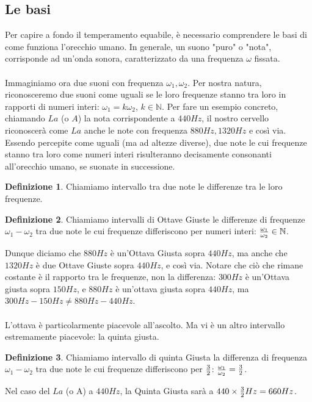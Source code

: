 \documentclass[12pt,a4paper]{book}
\theoremstyle{definition}
\newtheorem{Def}{Definizione}[chapter]
\theoremstyle{Theorem}
\theoremstyle{definition}
\theoremstyle{definition}
\theoremstyle{definition}
\begin{document}
	\subsection{Le basi}
	Per capire a fondo il temperamento equabile, è necessario comprendere le basi di come funziona l'orecchio umano. In generale, un suono "puro" o "nota", corrisponde ad un'onda sonora, caratterizzato da una frequenza $\omega$ fissata.\\
	\\
	Immaginiamo ora due suoni con frequenza $\omega_1,\omega_2$. Per nostra natura, riconosceremo due suoni come uguali se le loro frequenze stanno tra loro in rapporti di numeri interi: $\omega_1=k\omega_2$, $k\in \mathbb{N}$. Per fare un esempio concreto, chiamando $La$ (o $A$) la nota corrispondente a $440 Hz$, il nostro cervello riconoscerà come $La$ anche le note con frequenza $880 Hz,1320 Hz$ e così via. Essendo percepite come uguali (ma ad altezze diverse), due note le cui frequenze stanno tra loro come numeri interi risulteranno decisamente consonanti all'orecchio umano, se suonate in successione.
	\begin{Def}
		Chiamiamo intervallo tra due note le differenze tra le loro frequenze.
	\end{Def}
	\begin{Def}
		Chiamiamo intervalli di Ottave Giuste le differenze di frequenze $\omega_1-\omega_2$ tra due note le cui frequenze differiscono per numeri interi: ${\omega_1\over\omega_2}\in \mathbb{N}$.
	\end{Def}
	Dunque diciamo che $880Hz$ è un'Ottava Giusta sopra $440 Hz$, ma anche che $1320 Hz$ è due Ottave Giuste sopra $440 Hz$, e così via. Notare che ciò che rimane costante è il rapporto tra le frequenze, non la differenza: $300Hz$ è un'Ottava giusta sopra $150 Hz$, e $880Hz$ è un'ottava giusta sopra $440 Hz$, ma $300Hz-150Hz\neq 880Hz-440Hz$.\\
	\\
	L'ottava è particolarmente piacevole all'ascolto. Ma vi è un altro intervallo estremamente piacevole: la quinta giusta.
	\begin{Def}
		Chiamiamo intervallo di quinta Giusta la differenza di frequenza $\omega_1-\omega_2$ tra due note le cui frequenze differiscono per $3\over 2$: ${\omega_1\over\omega_2}={3\over 2}$.
	\end{Def}
	Nel caso del $La$ (o A) a $440 Hz$, la Quinta Giusta sarà a $440\times {3\over 2}Hz=660 Hz$.\\
	\\
\end{document}
